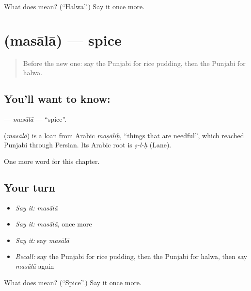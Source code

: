 \begin{tcolorbox}[breakable,colback=teal!4,colframe=teal!35!black,title={Before you move on}]
What does  mean? (\textquotedblleft{}Halwa\textquotedblright{}.) Say it once more.
\end{tcolorbox}
\section[\texorpdfstring{\pa{ਮਸਾਲਾ} (masālā)}{ਮਸਾਲਾ (masālā)}]{ (masālā) — spice}

\label{lesson:PA-C125-masala}



\begin{quote}
Before the new one: say the Punjabi for rice pudding, then the Punjabi for halwa.
\end{quote}

\subsection*{You'll want to know: }
\textbf{} — \emph{masālā} — \textquotedblleft{}spice\textquotedblright{}.

\begin{cousinweb}
\textbf{} (\emph{masālā}) is a loan from Arabic \emph{maṣāliḥ}, \textquotedblleft{}things that are needful\textquotedblright{}, which reached Punjabi through Persian. Its Arabic root is \emph{ṣ-l-ḥ} (Lane).
\end{cousinweb}

\begin{grammarlens}[title={What you've built}]
One more word for this chapter.
\end{grammarlens}

\subsection*{Your turn}
\begin{itemize}
\raggedright
  \item \emph{Say it:} \emph{masālā}
  \item \emph{Say it:} \emph{masālā}, once more
  \item \emph{Say it:} say \emph{masālā}
  \item \emph{Recall:} say the Punjabi for rice pudding, then the Punjabi for halwa, then say \emph{masālā} again
\end{itemize}

\begin{tcolorbox}[breakable,colback=teal!4,colframe=teal!35!black,title={Before you move on}]
What does  mean? (\textquotedblleft{}Spice\textquotedblright{}.) Say it once more.
\end{tcolorbox}
